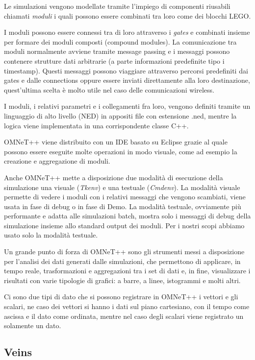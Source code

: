 Le simulazioni vengono modellate tramite l'impiego di componenti riusabili chiamati \emph{moduli} i quali possono essere combinati tra loro come dei blocchi LEGO.

I moduli possono essere connessi tra di loro attraverso i \emph{gates} e combinati insieme per formare dei moduli composti (compound modules). La comunicazione tra moduli normalmente avviene tramite message passing e i messaggi possono contenere strutture dati arbitrarie (a parte informazioni predefinite tipo i timestamp). Questi messaggi possono viaggiare attraverso percorsi predefiniti dai gates e dalle connections oppure essere inviati direttamente alla loro destinazione, quest'ultima scelta è molto utile nel caso delle comunicazioni wireless. 

I moduli, i relativi parametri e i collegamenti fra loro, vengono definiti tramite un linguaggio di alto livello (NED) in appositi file con estensione .ned, mentre la logica viene implementata in una corrispondente classe C++.

OMNeT++ viene distribuito con un IDE basato su Eclipse grazie al quale possono essere eseguite molte operazioni in modo visuale, come ad esempio la creazione e aggregazione di moduli.

Anche OMNeT++ mette a disposizione due modalità di esecuzione della simulazione una visuale (\emph{Tkenv}) e una testuale (\emph{Cmdenv}). La modalità visuale permette di vedere i moduli con i relativi messaggi che vengono scambiati, viene usata in fase di debug o in fase di Demo. La modalità testuale, ovviamente più performante e adatta alle simulazioni batch, mostra solo i messaggi di debug della simulazione insieme allo standard output dei moduli. Per i nostri scopi abbiamo usato solo la modalità testuale.

Un grande punto di forza di OMNeT++ sono gli strumenti messi a disposizione per l'analisi dei dati generati dalle simulazioni, che permettono di applicare, in tempo reale, trasformazioni e aggregazioni tra i set di dati e, in fine, visualizzare i risultati con varie tipologie di grafici: a barre, a linee, istogrammi e molti altri.

Ci sono due tipi di dato che si possono registrare in OMNeT++ i vettori e gli scalari, ne caso dei vettori si hanno i dati sul piano cartesiano, con il tempo come ascissa e il dato come ordinata, mentre nel caso degli scalari viene registrato un solamente un dato.

\subsection{Veins}\label{subsec:veins}

